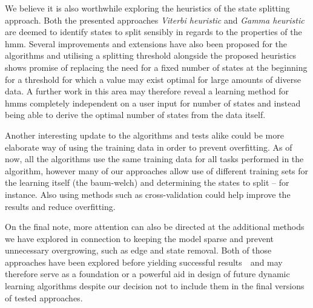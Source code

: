 We believe it is also worthwhile exploring the heuristics of the state splitting approach. Both the presented approaches \emph{Viterbi heuristic} and \emph{Gamma heuristic} are deemed to identify states to split sensibly in regards to the properties of the \gls{hmm}. Several improvements and extensions have also been proposed for the algorithms and utilising a splitting threshold alongside the proposed heuristics shows promise of replacing the need for a fixed number of states at the beginning for a threshold for which a value may exist optimal for large amounts of diverse data. A further work in this area may therefore reveal a learning method for \glspl{hmm} completely independent on a user input for number of states and instead being able to derive the optimal number of states from the data itself.

Another interesting update to the algorithms and tests alike could be more elaborate way of using the training data in order to prevent overfitting. As of now, all the algorithms use the same training data for all tasks performed in the algorithm, however many of our approaches allow use of different training sets for the learning itself (the \gls{baum-welch}) and determining the states to split -- for instance. Also using methods such as cross-validation could help improve the results and reduce overfitting.

On the final note, more attention can also be directed at the additional methods we have explored in connection to keeping the model sparse and prevent unnecessary overgrowing, such as edge and state removal. Both of those approaches have been explored before yielding successful results~\cite{bicego2003, bicego2007}~and may therefore serve as a foundation or a powerful aid in design of future dynamic learning algorithms despite our decision not to include them in the final versions of tested approaches.